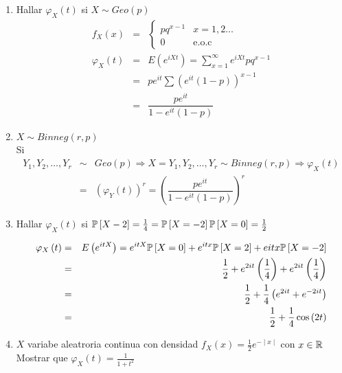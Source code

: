 \begin{enumerate}
\item Hallar $\varphi_{X}\left(t\right)$ si $X \sim Geo \left(p \right)$
\begin{eqnarray*}
f_{X} \left(x \right) &=& \begin{cases}
pq^{x-1} & x=1,2\ldots \\
0 & \textrm{e.o.c}
\end{cases}\\
\varphi_{X}\left(t \right)&=& E \left( e^{iXt} \right)= \sum_{x=1}^{\infty} e^{iXt} pq^{x-1} \\
&=& pe^{it} \sum \left(e^{it}\left( 1-p\right) \right)^{x-1}\\
&=& \dfrac{pe^{it}}{1-e^{it}\left(1-p \right) }
\end{eqnarray*}
\item $X \sim Bin neg \left(r,p \right)$\\
Si 
\begin{eqnarray*}
Y_{1}, Y_{2}, \ldots, Y_{r} &\sim& Geo \left(p \right) \Rightarrow X= Y_{1}, Y_{2}, \ldots, Y_{r} \sim Binneg \left(r,p \right) \Rightarrow \varphi_{X} \left(t \right)\\
&=& \left( \varphi_{Y} \left(t \right) \right)^{r}
 =\left(\dfrac{pe^{it}}{1-e^{it}\left(1-p \right) } \right)^{r}
\end{eqnarray*}
\item Hallar $\varphi_{X} \left(t \right)$ si $\mathbb{P} \left[X-2 \right]= \frac{1}{4}= \mathbb{P} \left[X=-2 \right] \mathbb{P} \left[X=0 \right]= \frac{1}{2}$

\begin{eqnarray*}
\varphi_{X} \left(t \right)&=& E \left(e^{itX} \right) = e^{itX} \mathbb{P} \left[X=0 \right]+ e^{itx} \mathbb{P} \left[X=2 \right]+ e {itx} \mathbb{P} \left[X=-2 \right]\\
&=& \frac{1}{2}+ e^{2it}\left(\frac{1}{4}\right)+ e^{2it} \left(\frac{1}{4}\right)\\
&=& \frac{1}{2} + \frac{1}{4} \left(e^{2it}+ e^{-2it} \right)\\
&=& \frac{1}{2} + \frac{1}{4} \cos \left(2t \right)
\end{eqnarray*}

\item $X$ variabe aleatroria continua con densidad $f_{X} \left(x \right)= \frac{1}{2} e ^{- \mid x \mid}$ con $x \in \mathbb{R}$ Mostrar que $\varphi_{X}\left(t \right)= \frac{1}{1+t^{2}}$


\end{enumerate}
